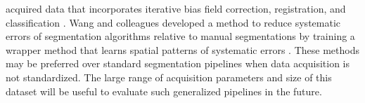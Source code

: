 acquired data that incorporates iterative bias field correction, registration, and classification \cite{optimize}. Wang and colleagues developed a method to reduce systematic errors of segmentation algorithms relative to manual segmentations by training a wrapper method that learns spatial patterns of systematic errors \cite{Wang2011}. These methods may be preferred over standard segmentation pipelines when data acquisition is not standardized. The large range of acquisition parameters and size of this dataset will be useful to evaluate such generalized pipelines in the future.
